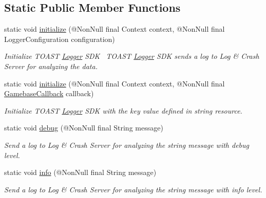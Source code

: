 \subsection*{Static Public Member Functions}
\begin{DoxyCompactItemize}
\item 
static void \hyperlink{classcom_1_1toast_1_1android_1_1gamebase_1_1_gamebase_1_1_logger_a62178526ec645ac412196b1f4c04ae18}{initialize} (@Non\+Null final Context context, @Non\+Null final Logger\+Configuration configuration)
\begin{DoxyCompactList}\small\item\em Initialize T\+O\+A\+ST \hyperlink{classcom_1_1toast_1_1android_1_1gamebase_1_1_gamebase_1_1_logger}{Logger} S\+DK~\newline
 T\+O\+A\+ST \hyperlink{classcom_1_1toast_1_1android_1_1gamebase_1_1_gamebase_1_1_logger}{Logger} S\+DK sends a log to Log \& Crash Server for analyzing the data. \end{DoxyCompactList}\item 
static void \hyperlink{classcom_1_1toast_1_1android_1_1gamebase_1_1_gamebase_1_1_logger_abc159a53d3abd20599610a6f66e9581e}{initialize} (@Non\+Null final Context context, @Non\+Null final \hyperlink{interfacecom_1_1toast_1_1android_1_1gamebase_1_1_gamebase_callback}{Gamebase\+Callback} callback)
\begin{DoxyCompactList}\small\item\em Initialize T\+O\+A\+ST \hyperlink{classcom_1_1toast_1_1android_1_1gamebase_1_1_gamebase_1_1_logger}{Logger} S\+DK with the key value defined in string resource. \end{DoxyCompactList}\item 
static void \hyperlink{classcom_1_1toast_1_1android_1_1gamebase_1_1_gamebase_1_1_logger_a6daac76adb572802174f928a4d181c05}{debug} (@Non\+Null final String message)
\begin{DoxyCompactList}\small\item\em Send a log to Log \& Crash Server for analyzing the string message with debug level. \end{DoxyCompactList}\item 
static void \hyperlink{classcom_1_1toast_1_1android_1_1gamebase_1_1_gamebase_1_1_logger_aa09d8515b3f516eb6ca6b3685ffe08a9}{info} (@Non\+Null final String message)
\begin{DoxyCompactList}\small\item\em Send a log to Log \& Crash Server for analyzing the string message with info level. \end{DoxyCompactList}\item 

\end{DoxyCompactItemize}
